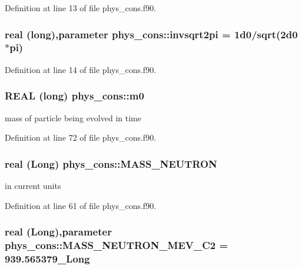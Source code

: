 Definition at line 13 of file phys\_\-cons.f90.

\hypertarget{namespacephys__cons_a369d33713444a99a71f80a74c0652d4e}{
\subsubsection[{invsqrt2pi}]{\setlength{\rightskip}{0pt plus 5cm}real (long),parameter {\bf phys\_\-cons::invsqrt2pi} = 1d0/sqrt(2d0$\ast$pi)}}
\label{namespacephys__cons_a369d33713444a99a71f80a74c0652d4e}


Definition at line 14 of file phys\_\-cons.f90.

\hypertarget{namespacephys__cons_afa35c20a6e2a70b58142d10071eeef10}{
\subsubsection[{m0}]{\setlength{\rightskip}{0pt plus 5cm}REAL (long) {\bf phys\_\-cons::m0}}}
\label{namespacephys__cons_afa35c20a6e2a70b58142d10071eeef10}


mass of particle being evolved in time 



Definition at line 72 of file phys\_\-cons.f90.

\hypertarget{namespacephys__cons_abeff422917cc48601644e90ab12fb7c0}{
\subsubsection[{MASS\_\-NEUTRON}]{\setlength{\rightskip}{0pt plus 5cm}real (Long) {\bf phys\_\-cons::MASS\_\-NEUTRON}}}
\label{namespacephys__cons_abeff422917cc48601644e90ab12fb7c0}


in current units 



Definition at line 61 of file phys\_\-cons.f90.

\hypertarget{namespacephys__cons_a9e80f5448f5f42cf9983890809e55d88}{
\subsubsection[{MASS\_\-NEUTRON\_\-MEV\_\-C2}]{\setlength{\rightskip}{0pt plus 5cm}real (Long),parameter {\bf phys\_\-cons::MASS\_\-NEUTRON\_\-MEV\_\-C2} = 939.565379\_\-Long}}
\label{namespacephys__cons_a9e80f5448f5f42cf9983890809e55d88}


